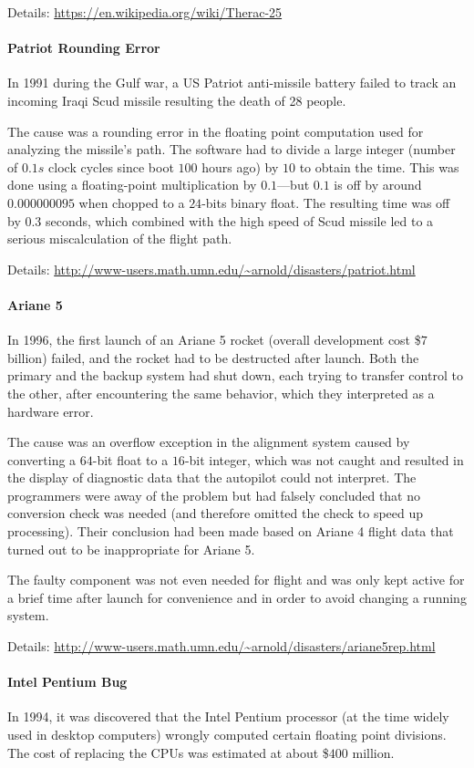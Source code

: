 Details: \url{https://en.wikipedia.org/wiki/Therac-25}

\paragraph{Patriot Rounding Error}
In 1991 during the Gulf war, a US Patriot anti-missile battery failed to track an incoming Iraqi Scud missile resulting the death of 28 people.

The cause was a rounding error in the floating point computation used for analyzing the missile's path.
The software had to divide a large integer (number of $0.1s$ clock cycles since boot $100$ hours ago) by $10$ to obtain the time.
This was done using a floating-point multiplication by $0.1$---but $0.1$ is off by around $0.000000095$ when chopped to a $24$-bits binary float.
The resulting time was off by $0.3$ seconds, which combined with the high speed of Scud missile led to a serious miscalculation of the flight path.

Details: \url{http://www-users.math.umn.edu/~arnold/disasters/patriot.html}

\paragraph{Ariane 5}
In 1996, the first launch of an Ariane 5 rocket (overall development cost \$$7$ billion) failed, and the rocket had to be destructed after launch.
Both the primary and the backup system had shut down, each trying to transfer control to the other, after encountering the same behavior, which they interpreted as a hardware error.

The cause was an overflow exception in the alignment system caused by converting a $64$-bit float to a $16$-bit integer, which was not caught and resulted in the display of diagnostic data that the autopilot could not interpret.
The programmers were away of the problem but had falsely concluded that no conversion check was needed (and therefore omitted the check to speed up processing).
Their conclusion had been made based on Ariane 4 flight data that turned out to be inappropriate for Ariane 5.

The faulty component was not even needed for flight and was only kept active for a brief time after launch for convenience and in order to avoid changing a running system.

Details: \url{http://www-users.math.umn.edu/~arnold/disasters/ariane5rep.html}

\paragraph{Intel Pentium Bug}
In 1994, it was discovered that the Intel Pentium processor (at the time widely used in desktop computers) wrongly computed certain floating point divisions.
The cost of replacing the CPUs was estimated at about \$$400$ million.

